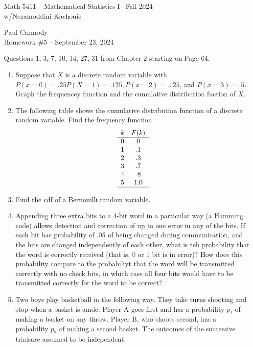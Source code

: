 \documentclass[10pt,a4paper]{report}
\newcommand{\CLASSNAME}{Math 5411 -- Mathematical Statistics I}
\newcommand{\PROFESSOR}{Nezamoddini-Kachouie}
\newcommand{\STUDENTNAME}{Paul Carmody}
\newcommand{\ASSIGNMENT}{Homework \#5 }
\newcommand{\DUEDATE}{September 23, 2024}
\newcommand{\SEMESTER}{Fall 2024}
\begin{document}
\begin{center}
	\Large{\CLASSNAME -- \SEMESTER} \\
	\large{w/\PROFESSOR}
\end{center}
\begin{center}
	\STUDENTNAME \\
	\ASSIGNMENT -- \DUEDATE\\
\end{center}

Questions 1, 3, 7, 10, 14, 27, 31 from Chapter 2 starting on Page 64.

\begin{enumerate}
	\item Suppose that $X$ is a discrete random variable with $P(x=0)=.25 P(X=1)=.125, P(x=2)=.125$, and $P(x=3)=.5$.  Graph the frequencey function and the cumulative distribution fuction of $X$.
	\setcounter{enumi}{2}
	\item The following table shows the cumulative distribution function of a discrete random variable.  Find the frequency function.
	\begin{align*}
	\begin{array}{cc}
		\hline
		k&F(k) \\
		\hline
		0 & 0 \\
		1 & .1 \\
		2 & .3 \\
		3 & .7 \\
		4 & .8 \\
		5 & 1.0 \\
		\hline
	\end{array}
	\end{align*}
	\setcounter{enumi}{6}
	\item Find the cdf of a Bernouilli random variable.
	\setcounter{enumi}{9}
	\item Appending three extra bits to a 4-bit word in a particular way (a Hamming code) allows detection and correction of up to one error in any of the bits.  If each bit has probability of .05 of being changed during communication, and the bits are changed independently of each other, what is teh probability that the word is correctly received (that is, 0 or 1 bit is in error)?  How does this probability compare to the probabiliyt that the word will be transmitted correctly with no check bits, in which case all four bits would have to be transmitted correctly for the word to be correct?
	\setcounter{enumi}{13}
	\item Two boys play basketball in the following way.  They take turns shooting and stop when a basket is amde.  Player A goes first and has a probability $p_1$ of making a basket on any throw.  Player B, who shoots second, has a probability $p_2$ of making a second basket.  The outcomes of the successive trialsare assumed to be independent.

\end{enumerate}
\end{document}
